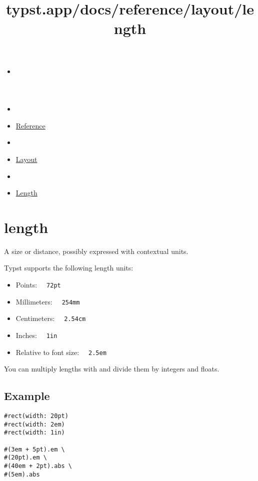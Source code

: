 \title{typst.app/docs/reference/layout/length}

\begin{itemize}
\tightlist
\item
  \href{/docs}{}
\item
  
\item
  \href{/docs/reference/}{Reference}
\item
  
\item
  \href{/docs/reference/layout/}{Layout}
\item
  
\item
  \href{/docs/reference/layout/length/}{Length}
\end{itemize}

\section{\texorpdfstring{{ length }}{ length }}\label{summary}

A size or distance, possibly expressed with contextual units.

Typst supports the following length units:

\begin{itemize}
\tightlist
\item
  Points: \texttt{\ }{\texttt{\ 72pt\ }}\texttt{\ }
\item
  Millimeters: \texttt{\ }{\texttt{\ 254mm\ }}\texttt{\ }
\item
  Centimeters: \texttt{\ }{\texttt{\ 2.54cm\ }}\texttt{\ }
\item
  Inches: \texttt{\ }{\texttt{\ 1in\ }}\texttt{\ }
\item
  Relative to font size: \texttt{\ }{\texttt{\ 2.5em\ }}\texttt{\ }
\end{itemize}

You can multiply lengths with and divide them by integers and floats.

\subsection{Example}\label{example}

\begin{verbatim}
#rect(width: 20pt)
#rect(width: 2em)
#rect(width: 1in)

#(3em + 5pt).em \
#(20pt).em \
#(40em + 2pt).abs \
#(5em).abs
\end{verbatim}

